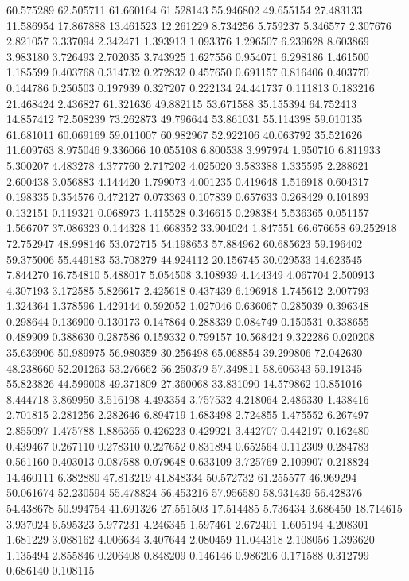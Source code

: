 60.575289
62.505711
61.660164
61.528143
55.946802
49.655154
27.483133
11.586954
17.867888
13.461523
12.261229
8.734256
5.759237
5.346577
2.307676
2.821057
3.337094
2.342471
1.393913
1.093376
1.296507
6.239628
8.603869
3.983180
3.726493
2.702035
3.743925
1.627556
0.954071
6.298186
1.461500
1.185599
0.403768
0.314732
0.272832
0.457650
0.691157
0.816406
0.403770
0.144786
0.250503
0.197939
0.327207
0.222134
24.441737
0.111813
0.183216
21.468424
2.436827
61.321636
49.882115
53.671588
35.155394
64.752413
14.857412
72.508239
73.262873
49.796644
53.861031
55.114398
59.010135
61.681011
60.069169
59.011007
60.982967
52.922106
40.063792
35.521626
11.609763
8.975046
9.336066
10.055108
6.800538
3.997974
1.950710
6.811933
5.300207
4.483278
4.377760
2.717202
4.025020
3.583388
1.335595
2.288621
2.600438
3.056883
4.144420
1.799073
4.001235
0.419648
1.516918
0.604317
0.198335
0.354576
0.472127
0.073363
0.107839
0.657633
0.268429
0.101893
0.132151
0.119321
0.068973
1.415528
0.346615
0.298384
5.536365
0.051157
1.566707
37.086323
0.144328
11.668352
33.904024
1.847551
66.676658
69.252918
72.752947
48.998146
53.072715
54.198653
57.884962
60.685623
59.196402
59.375006
55.449183
53.708279
44.924112
20.156745
30.029533
14.623545
7.844270
16.754810
5.488017
5.054508
3.108939
4.144349
4.067704
2.500913
4.307193
3.172585
5.826617
2.425618
0.437439
6.196918
1.745612
2.007793
1.324364
1.378596
1.429144
0.592052
1.027046
0.636067
0.285039
0.396348
0.298644
0.136900
0.130173
0.147864
0.288339
0.084749
0.150531
0.338655
0.489909
0.388630
0.287586
0.159332
0.799157
10.568424
9.322286
0.020208
35.636906
50.989975
56.980359
30.256498
65.068854
39.299806
72.042630
48.238660
52.201263
53.276662
56.250379
57.349811
58.606343
59.191345
55.823826
44.599008
49.371809
27.360068
33.831090
14.579862
10.851016
8.444718
3.869950
3.516198
4.493354
3.757532
4.218064
2.486330
1.438416
2.701815
2.281256
2.282646
6.894719
1.683498
2.724855
1.475552
6.267497
2.855097
1.475788
1.886365
0.426223
0.429921
3.442707
0.442197
0.162480
0.439467
0.267110
0.278310
0.227652
0.831894
0.652564
0.112309
0.284783
0.561160
0.403013
0.087588
0.079648
0.633109
3.725769
2.109907
0.218824
14.460111
6.382880
47.813219
41.848334
50.572732
61.255577
46.969294
50.061674
52.230594
55.478824
56.453216
57.956580
58.931439
56.428376
54.438678
50.994754
41.691326
27.551503
17.514485
5.736434
3.686450
18.714615
3.937024
6.595323
5.977231
4.246345
1.597461
2.672401
1.605194
4.208301
1.681229
3.088162
4.006634
3.407644
2.080459
11.044318
2.108056
1.393620
1.135494
2.855846
0.206408
0.848209
0.146146
0.986206
0.171588
0.312799
0.686140
0.108115
